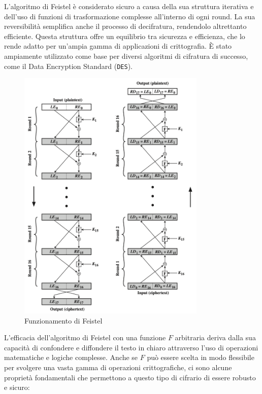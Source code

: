 L'algoritmo di Feistel è considerato sicuro a causa della sua struttura
iterativa e dell'uso di funzioni di trasformazione complesse all'interno
di ogni round. La sua reversibilità semplifica anche il processo di
decifratura, rendendolo altrettanto efficiente. Questa struttura offre
un equilibrio tra sicurezza e efficienza, che lo rende adatto per un'ampia
gamma di applicazioni di crittografia. È stato ampiamente utilizzato come
base per diversi algoritmi di cifratura di successo, come il Data Encryption
Standard (\verb|DES|).
\begin{figure}[H]
    \centering
    \includegraphics[width=0.8\textwidth]{img/feister.png}
    \caption{Funzionamento di Feistel}
    \label{fig:feistel}
\end{figure}
L'efficacia dell'algoritmo di Feistel con una funzione \(F\)
arbitraria deriva dalla sua capacità di confondere e diffondere
il testo in chiaro attraverso l'uso di operazioni matematiche e logiche
complesse. Anche se \(F\) può essere scelta in modo flessibile per svolgere
una vasta gamma di operazioni crittografiche, ci sono alcune proprietà
fondamentali che permettono a questo tipo di cifrario di essere robusto e
sicuro:

